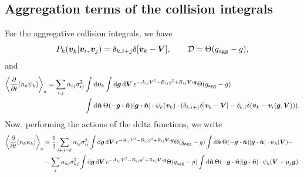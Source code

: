 \documentclass[aps,prl,preprint,groupedaddress,10pt]{revtex4-2}
\begin{document}
\subsection{Aggregation terms of the collision integrals}
For the aggregative collision integrals, we have
\begin{equation}
    P_k(\bv_k\vert\bv_i,\bv_j)=\delta_{k,i+j}\delta\bqty{\bv_k-\bV},\qquad
    \mathcal{D}=\Theta\pqty{\ltx{g}{agg}-g},
\end{equation}
and
\begin{equation}
    \begin{split}
        \avg{\pdv{t}(n_k\psi_k)}_a=\sum_{i,j}\alpha_{ij}\sigma_{ij}^2&\int\dd{\bv_k}\int
        \dd{\bg}\dd{\bV}e^{-A_{ij}V^2-B_{ij}g^2+R_{ij}\bV\vdot\bg}\Theta(\ltx{g}{agg}-g)\\
        &\int\dd{\bn}\Theta\pqty{-\bg\vdot\bn}\abs{\bg\vdot\bn}\cdot\psi_k(\bv_k)\cdot
        \pqty{\delta_{k,i+j}\delta\bqty{\bv_k-\bV}-\delta_{k,i}\delta\pqty{\bv_k-\bv_i(\bg,\bV)}}.
    \end{split}
\end{equation}
Now, performing the actions of the delta functions, we write
\begin{equation}
    \begin{split}
        \avg{\pdv{t}(n_k\psi_k)}_a&=\frac{1}{2}\sum_{i+j=k}\alpha_{ij}\sigma_{ij}^2
        \int\dd{\bg}\dd{\bV}e^{-A_{ij}V^2-B_{ij}g^2+R_{ij}\bV\vdot\bg}\Theta(\ltx{g}{agg}-g)
        \int\dd{\bn}\Theta\pqty{-\bg\vdot\bn}\abs{\bg\vdot\bn}\cdot\psi_k(\bV)-\\
        &-\sum_{j}\alpha_{kj}\sigma_{kj}^2\int\dd{\bg}\dd{\bV}e^{-A_{kj}V^2-B_{kj}g^2+R_{kj}\bV\vdot\bg}
        \Theta(\ltx{g}{agg}-g)\int\dd{\bn}\Theta\pqty{-\bg\vdot\bn}\abs{\bg\vdot\bn}
        \cdot\psi_k(\bV+\mu_j\bg).
    \end{split}
\end{equation}
\end{document}
